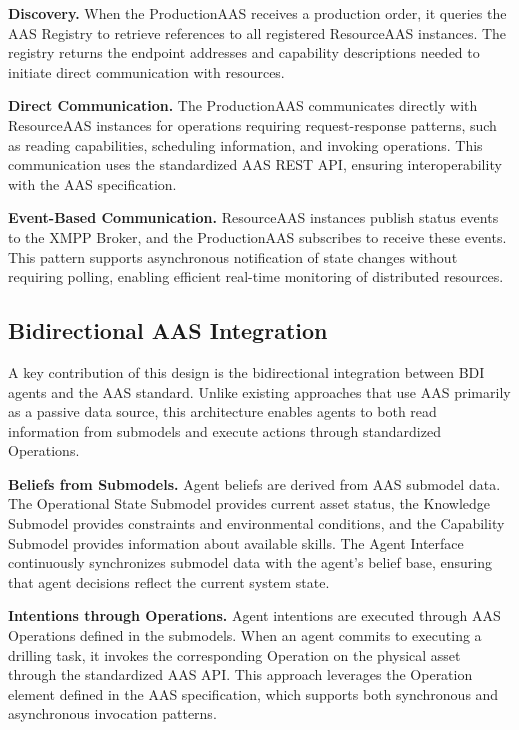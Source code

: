 \textbf{Discovery.} When the ProductionAAS receives a production order, it queries the AAS Registry to retrieve references to all registered ResourceAAS instances. The registry returns the endpoint addresses and capability descriptions needed to initiate direct communication with resources.

\textbf{Direct Communication.} The ProductionAAS communicates directly with ResourceAAS instances for operations requiring request-response patterns, such as reading capabilities, scheduling information, and invoking operations. This communication uses the standardized \ac{AAS} REST API, ensuring interoperability with the \ac{AAS} specification.

\textbf{Event-Based Communication.} ResourceAAS instances publish status events to the XMPP Broker, and the ProductionAAS subscribes to receive these events. This pattern supports asynchronous notification of state changes without requiring polling, enabling efficient real-time monitoring of distributed resources.


\subsection{Bidirectional AAS Integration}

A key contribution of this design is the bidirectional integration between \ac{BDI} agents and the \ac{AAS} standard. Unlike existing approaches that use \ac{AAS} primarily as a passive data source, this architecture enables agents to both read information from submodels and execute actions through standardized Operations.

\textbf{Beliefs from Submodels.} Agent beliefs are derived from \ac{AAS} submodel data. The Operational State Submodel provides current asset status, the Knowledge Submodel provides constraints and environmental conditions, and the Capability Submodel provides information about available skills. The Agent Interface continuously synchronizes submodel data with the agent's belief base, ensuring that agent decisions reflect the current system state.

\textbf{Intentions through Operations.} Agent intentions are executed through \ac{AAS} Operations defined in the submodels. When an agent commits to executing a drilling task, it invokes the corresponding Operation on the physical asset through the standardized \ac{AAS} API. This approach leverages the Operation element defined in the \ac{AAS} specification, which supports both synchronous and asynchronous invocation patterns.

